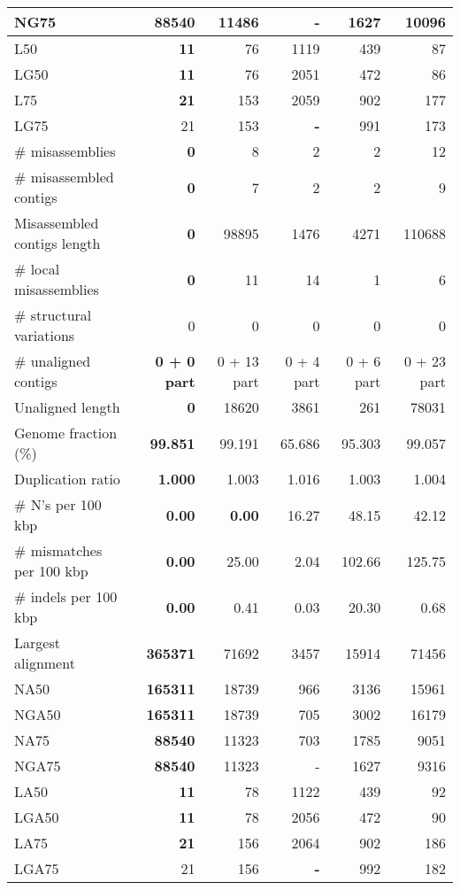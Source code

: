\documentclass[12pt,a4paper]{article}
\begin{document}
\begin{table}[ht]
\begin{center}
\begin{tabular}{|l*{5}{|r}|}
NG75 & {\bf 88540} & 11486 & - & 1627 & 10096 \\ \hline
L50 & {\bf 11} & 76 & 1119 & 439 & 87 \\ \hline
LG50 & {\bf 11} & 76 & 2051 & 472 & 86 \\ \hline
L75 & {\bf 21} & 153 & 2059 & 902 & 177 \\ \hline
LG75 & 21 & 153 & {\bf -} & 991 & 173 \\ \hline
\# misassemblies & {\bf 0} & 8 & 2 & 2 & 12 \\ \hline
\# misassembled contigs & {\bf 0} & 7 & 2 & 2 & 9 \\ \hline
Misassembled contigs length & {\bf 0} & 98895 & 1476 & 4271 & 110688 \\ \hline
\# local misassemblies & {\bf 0} & 11 & 14 & 1 & 6 \\ \hline
\# structural variations & 0 & 0 & 0 & 0 & 0 \\ \hline
\# unaligned contigs & {\bf 0 + 0 part} & 0 + 13 part & 0 + 4 part & 0 + 6 part & 0 + 23 part \\ \hline
Unaligned length & {\bf 0} & 18620 & 3861 & 261 & 78031 \\ \hline
Genome fraction (\%) & {\bf 99.851} & 99.191 & 65.686 & 95.303 & 99.057 \\ \hline
Duplication ratio & {\bf 1.000} & 1.003 & 1.016 & 1.003 & 1.004 \\ \hline
\# N's per 100 kbp & {\bf 0.00} & {\bf 0.00} & 16.27 & 48.15 & 42.12 \\ \hline
\# mismatches per 100 kbp & {\bf 0.00} & 25.00 & 2.04 & 102.66 & 125.75 \\ \hline
\# indels per 100 kbp & {\bf 0.00} & 0.41 & 0.03 & 20.30 & 0.68 \\ \hline
Largest alignment & {\bf 365371} & 71692 & 3457 & 15914 & 71456 \\ \hline
NA50 & {\bf 165311} & 18739 & 966 & 3136 & 15961 \\ \hline
NGA50 & {\bf 165311} & 18739 & 705 & 3002 & 16179 \\ \hline
NA75 & {\bf 88540} & 11323 & 703 & 1785 & 9051 \\ \hline
NGA75 & {\bf 88540} & 11323 & - & 1627 & 9316 \\ \hline
LA50 & {\bf 11} & 78 & 1122 & 439 & 92 \\ \hline
LGA50 & {\bf 11} & 78 & 2056 & 472 & 90 \\ \hline
LA75 & {\bf 21} & 156 & 2064 & 902 & 186 \\ \hline
LGA75 & 21 & 156 & {\bf -} & 992 & 182 \\ \hline
\end{tabular}
\end{center}
\end{table}
\end{document}
